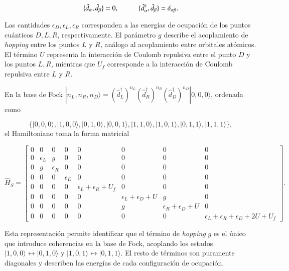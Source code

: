 \begin{equation*}
    \{\hat{d}_{\alpha},\hat{d}_{\beta} \} = 0, \hspace{10mm} \{\hat{d}^{\dagger}_{\alpha}, \hat{d}_{\beta} \} = \delta_{\alpha \beta}.
\end{equation*}

Las cantidades $\epsilon_{D}, \epsilon_{L}, \epsilon_{R}$ corresponden a las energías de ocupación de los puntos cuánticos $D, L, R$, respectivamente. El parámetro $g$ describe el acoplamiento de \textit{hopping} entre los puntos $L$ y $R$, análogo al acoplamiento entre orbitales atómicos\cite{simon2013oxford}. El término $U$ representa la interacción de Coulomb repulsiva entre el punto $D$ y los puntos $L, R$, mientras que $U_{f}$ corresponde a la interacción de Coulomb repulsiva entre $L$ y $R$.

En la base de Fock $|n_{L},n_{R},n_{D} \rangle = (\hat{d}^{\dagger}_{L})^{n_{L}}(\hat{d}^{\dagger}_{R})^{n_{R}}(\hat{d}^{\dagger}_{D})^{n_{D}}|0,0,0\rangle$, ordenada como

\begin{equation*}
     \{|0,0,0\rangle, |1,0,0\rangle, |0,1,0\rangle, |0,0,1\rangle, |1,1,0\rangle, |1,0,1\rangle, |0,1,1\rangle, |1,1,1\rangle\},
\end{equation*}
el Hamiltoniano toma la forma matricial 

\begin{equation*}
    \hat{H}_{S} = 
    \begin{bmatrix}
        0 & 0 & 0 & 0 & 0 & 0 & 0 & 0 \\
        0 & \epsilon_{L} & g & 0 & 0 & 0 & 0 & 0 \\
        0 & g & \epsilon_{R} & 0 & 0 & 0 & 0 & 0 \\
        0 & 0 & 0 & \epsilon_{D} & 0 & 0 & 0 & 0 \\
        0 & 0 & 0 & 0 & \epsilon_{L} + \epsilon_{R}  + U_{f} & 0 & 0 & 0 \\
        0 & 0 & 0 & 0 & 0 & \epsilon_{L} + \epsilon_{D} + U & g & 0 \\
        0 & 0 & 0 & 0 & 0 & g & \epsilon_{R} + \epsilon_{D} + U & 0 \\
        0 & 0 & 0 & 0 & 0 & 0 & 0 & \epsilon_{L} + \epsilon_{R}  + \epsilon_{D} + 2U + U_{f} 
        \end{bmatrix}.
\end{equation*}

Esta representación permite identificar que el término de \textit{hopping} $g$ es el único que introduce coherencias en la base de Fock, acoplando los estados $|1,0,0\rangle \leftrightarrow |0,1,0\rangle$ y $|1,0,1\rangle \leftrightarrow |0,1,1\rangle$. El resto de términos son puramente diagonales y describen las energías de cada configuración de ocupación.

